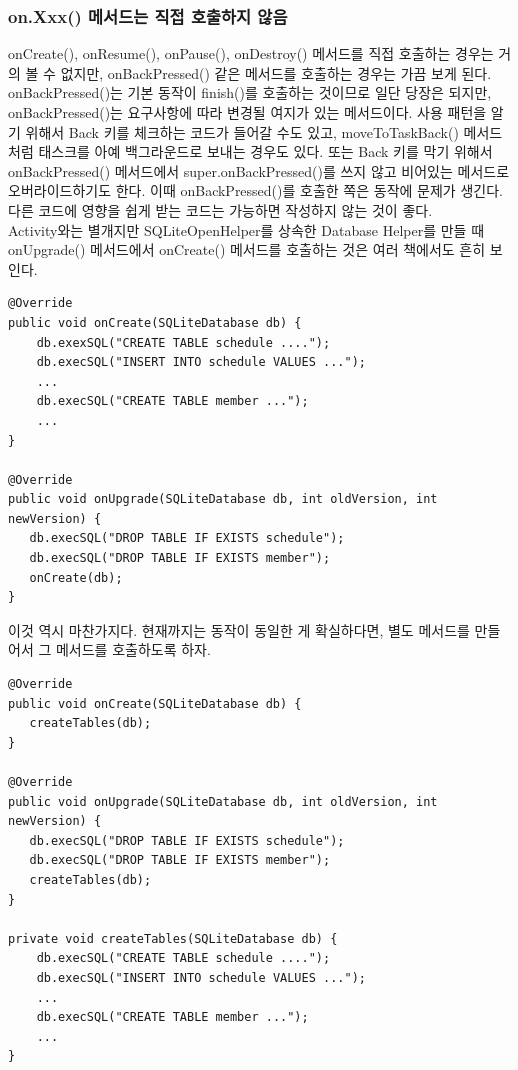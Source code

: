 \subsubsection{on.Xxx() 메서드는 직접 호출하지 않음}
onCreate(), onResume(), onPause(), onDestroy() 메서드를 직접 호출하는 경우는 거의 볼 수 없지만, onBackPressed() 같은 메서드를 호출하는 경우는 가끔 보게 된다.
onBackPressed()는 기본 동작이 finish()를 호출하는 것이므로 일단 당장은 되지만, onBackPressed()는 요구사항에 따라 변경될 여지가 있는 메서드이다.
사용 패턴을 알기 위해서 Back 키를 체크하는 코드가 들어갈 수도 있고, moveToTaskBack() 메서드처럼 태스크를 아예 백그라운드로 보내는 경우도 있다. 또는 Back 키를 막기 위해서 onBackPressed() 메서드에서 super.onBackPressed()를 쓰지 않고 비어있는 메서드로 오버라이드하기도 한다. 이때 onBackPressed()를 호출한 쪽은 동작에 문제가 생긴다. 
다른 코드에 영향을 쉽게 받는 코드는 가능하면 작성하지 않는 것이 좋다.\\

Activity와는 별개지만 SQLiteOpenHelper를 상속한 Database Helper를 만들 때 onUpgrade() 메서드에서 onCreate() 메서드를 호출하는 것은 여러 책에서도 흔히 보인다.
\begin{lstlisting}[frame=single]
@Override
public void onCreate(SQLiteDatabase db) {
    db.exexSQL("CREATE TABLE schedule ....");
    db.execSQL("INSERT INTO schedule VALUES ...");
    ...
    db.execSQL("CREATE TABLE member ...");
    ...
}

@Override
public void onUpgrade(SQLiteDatabase db, int oldVersion, int newVersion) {
   db.execSQL("DROP TABLE IF EXISTS schedule");
   db.execSQL("DROP TABLE IF EXISTS member");
   onCreate(db);
}
\end{lstlisting}
이것 역시 마찬가지다. 현재까지는 동작이 동일한 게 확실하다면, 별도 메서드를 만들어서 그 메서드를 호출하도록 하자.

\begin{lstlisting}[frame=single]
@Override
public void onCreate(SQLiteDatabase db) {
   createTables(db);
}

@Override
public void onUpgrade(SQLiteDatabase db, int oldVersion, int newVersion) {
   db.execSQL("DROP TABLE IF EXISTS schedule");
   db.execSQL("DROP TABLE IF EXISTS member");
   createTables(db);
}

private void createTables(SQLiteDatabase db) {
	db.execSQL("CREATE TABLE schedule ....");
    db.execSQL("INSERT INTO schedule VALUES ...");
    ...
    db.execSQL("CREATE TABLE member ...");
    ...
}
\end{lstlisting}

